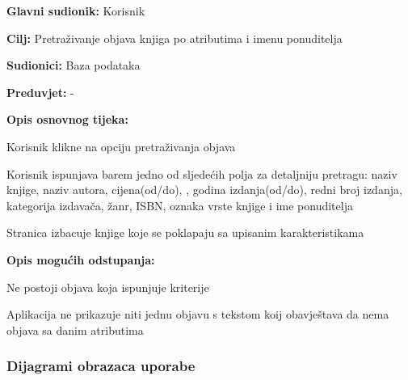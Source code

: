                     \noindent {}
					\begin{packed_item}
	
						\item \textbf{Glavni sudionik: } Korisnik
						\item  \textbf{Cilj:} Pretraživanje objava knjiga po atributima i imenu ponuditelja
						\item  \textbf{Sudionici:} Baza podataka
						\item  \textbf{Preduvjet:} - 
						\item  \textbf{Opis osnovnog tijeka:}
						
						\item[] \begin{packed_enum}
	
							\item Korisnik klikne na opciju pretraživanja objava
							\item Korisnik ispunjava barem jedno od sljedećih polja za detaljniju pretragu: naziv knjige, naziv autora, cijena(od/do), , godina izdanja(od/do), redni broj izdanja, kategorija izdavača, žanr, ISBN, oznaka vrste knjige i ime ponuditelja
                            					\item Stranica izbacuje knjige koje se poklapaju sa upisanim karakteristikama
						\end{packed_enum}
						
						\item  \textbf{Opis mogućih odstupanja: }
						
						\item[] \begin{packed_item}
	
							\item[2.a] Ne postoji objava koja ispunjuje kriterije
							\item[] \begin{packed_enum}
								
								\item Aplikacija ne prikazuje niti jednu objavu s tekstom koij obavještava da nema objava sa danim atributima 
							\end{packed_enum}
                            					
						\end{packed_item}
					\end{packed_item}

				\eject	
				
				\subsubsection{Dijagrami obrazaca uporabe}
					
